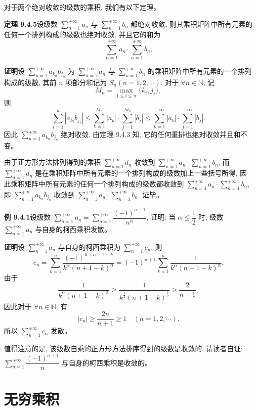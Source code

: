 \documentclass[UTF8, 12pt, fontset=fandol, oneside]{ctexart}
\begin{document}
对于两个绝对收敛的级数的乘积, 我们有以下定理。

\noindent\textbf{定理 9.4.5}\quad 设级数 $\sum\limits_{n=1}^{+\infty}a_n$ 与 $\sum\limits_{n=1}^{+\infty}b_n$ 都绝对收敛, 则其乘积矩阵中所有元素的任何一个排列构成的级数也绝对收敛, 并且它的和为
\[
  \sum_{n=1}^{+\infty}a_n\cdot\sum_{n=1}^{+\infty}b_n.
\]

\noindent\textbf{证明}\quad 设 $\sum\limits_{n=1}^{+\infty}a_{k_n}b_{j_n}$ 为 $\sum\limits_{n=1}^{+\infty}a_n$ 与 $\sum\limits_{n=1}^{+\infty}b_n$ 的乘积矩阵中所有元素的一个排列构成的级数, 其前 $n$ 项部分和记为 $S_n(n=1,2,\cdots)$. 对于 $\forall n\in\mathbb{N}$, 记
\[
  M_n=\max_{1\leq i\leq n}\{k_i,j_i\},
\]
则
\[
  \sum_{i=1}^n|a_{k_i}b_{j_i}|
  \leq\sum_{k=1}^{M_n}|a_k|\cdot\sum_{j=1}^{M_n}|b_j|
  \leq\sum_{k=1}^{+\infty}|a_k|\cdot\sum_{j=1}^{+\infty}|b_j|.
\]
因此 $\sum\limits_{n=1}^{+\infty}a_{k_n}b_{j_n}$ 绝对收敛. 由定理 9.4.3 知, 它的任何重排也绝对收敛并且和不变。

由于正方形方法排列得到的乘积 $\sum\limits_{n=1}^{+\infty}d_n$ 收敛到 $\sum\limits_{n=1}^{+\infty}a_n\cdot\sum\limits_{n=1}^{+\infty}b_n$, 而 $\sum\limits_{n=1}^{+\infty}d_n$ 是在乘积矩阵中所有元素的一个排列构成的级数加上一些括号所得, 因此乘积矩阵中所有元素的任何一个排列构成的级数都收敛到 $\sum\limits_{n=1}^{+\infty}a_n\cdot\sum\limits_{n=1}^{+\infty}b_n$, 即 $\sum\limits_{n=1}^{+\infty}a_{k_n}b_{j_n}$ 收敛到 $\sum\limits_{n=1}^{+\infty}a_n\cdot\sum\limits_{n=1}^{+\infty}b_n$. 证毕。

\noindent\textbf{例 9.4.1}\quad 设级数 $\sum\limits_{n=1}^{+\infty}a_n=\sum\limits_{n=1}^{+\infty}\dfrac{(-1)^{n+1}}{n^\alpha}$, 证明: 当 $\alpha\leq\dfrac12$ 时, 级数 $\sum\limits_{n=1}^{+\infty}a_n$ 与自身的柯西乘积发散。

\noindent\textbf{证明}\quad 设 $\sum\limits_{n=1}^{+\infty}a_n$ 与自身的柯西乘积为 $\sum\limits_{n=1}^{+\infty}c_n$, 则
\[
  c_n=\sum_{k=1}^n\frac{(-1)^{k+n+1-k}}{k^\alpha(n+1-k)^\alpha}
  =(-1)^{n+1}\sum_{k=1}^n\frac1{k^\alpha(n+1-k)^\alpha}.
\]
由于
\[
  \frac1{k^\alpha(n+1-k)^\alpha}
  \geq\frac1{k^{\frac12}(n+1-k)^{\frac12}}
  \geq\frac2{n+1},
\]
因此对于 $\forall n\in\mathbb{N}$, 有
\[
  |c_n|\geq\frac{2n}{n+1}\geq1\quad(n=1,2,\cdots).
\]
所以 $\sum\limits_{n=1}^{+\infty}c_n$ 发散。

值得注意的是, 该级数自乘的正方形方法排序得到的级数是收敛的. 请读者自证: $\sum\limits_{n=1}^{+\infty}\dfrac{(-1)^{n+1}}{n}$ 与自身的柯西乘积是收敛的。

\section{无穷乘积}
\end{document}
